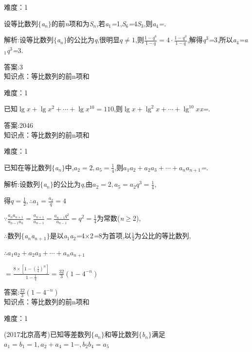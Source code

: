 \documentclass{article} %
\begin{document}
难度：1

 设等比数列$\mathrm{\{}$\textit{a${}_{n}$}$\mathrm{\}}$的前\textit{n}项和为\textit{S${}_{n}$},若\textit{a}${}_{1}$\textit{=}1,\textit{S}${}_{6}$\textit{=}4\textit{S}${}_{3}$,则\textit{a}${}_{4}$\textit{=\underbar{　　　　　}.~}

 解析:设等比数列$\mathrm{\{}$\textit{a${}_{n}$}$\mathrm{\}}$的公比为\textit{q},很明显$q\ne 1$,则$\frac{1-q^6}{1-q}=4\cdot \frac{1-q^3}{1-q}$,解得\textit{q}${}^{3}$\textit{=}3,所以\textit{a}${}_{4}$\textit{=a}${}_{1}$\textit{q}${}^{3}$\textit{=}3\textit{.}

 答案:3 \\

知识点：等比数列的前n项和

难度：1

 已知$\lg x+\lg x^2+\cdots +\lg x^{10}=110$,则$\lg x+\lg^2 x+\cdots +\lg^{10}x$\textit{x=\underbar{　　　　　　}.~}

 答案:2046 \\

知识点：等比数列的前n项和

难度：1

 已知在等比数列$\mathrm{\{}$\textit{a${}_{n}$}$\mathrm{\}}$中,$a_2=2,a_5=\frac{1}{4}$,则$a_1a_2+a_2a_3+\cdots +a_na_{n+1}$\textit{=\underbar{　　　　　　　　　　}.~}

 解析:设数列$\mathrm{\{}$\textit{a${}_{n}$}$\mathrm{\}}$的公比为\textit{q},由$a_2=2,a_5=a_2q^3=\frac{1}{4}$,

得$q=\frac{1}{2},\therefore a_1=\frac{a_2}{q}=4$

$\because \frac{a_na_{n+1}}{a_{n-1}a_n}=\frac{a_{n+1}}{a_{n-1}}=\frac{a_{n-1}q^2}{a_{n-1}}=q^2=\frac{1}{4}$为常数(\textit{n}$\mathrm{\ge}$2),

\textit{$\therefore$}数列$\mathrm{\{}$\textit{a${}_{n}$a${}_{n+}$}${}_{1}$$\mathrm{\}}$是以\textit{a}${}_{1}$\textit{a}${}_{2}$\textit{=}4\textit{$\times$}2\textit{=}8为首项,以$\frac{1}{4}$为公比的等比数列,

$\therefore a_1a_2+a_2a_3+\cdots +a_na_{n+1}$

$=\frac{8\times [1-(\frac{1}{4})^n]}{1-\frac{1}{4}}=\frac{32}{3}(1-4^{-n})$

 答案:$\frac{32}{3}(1-4^{-n})$ \\

知识点：等比数列的前n项和

难度：1

 (2017北京高考)已知等差数列$\mathrm{\{}$\textit{a${}_{n}$}$\mathrm{\}}$和等比数列$\mathrm{\{}$\textit{b${}_{n}$}$\mathrm{\}}$满足$a_1=b_1=1,a_2+a_4=1-,b_2b_4=a_5$
\end{document}
